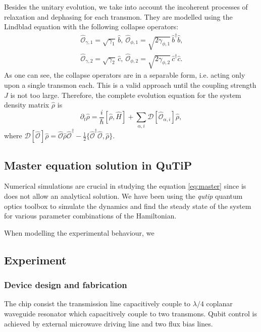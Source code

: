 \documentclass[%
 aip,
 amsmath,amssymb,
 reprint,%
]{revtex4-1}
\begin{document}
Besides the unitary evolution, we take into account the incoherent processes of relaxation and dephasing for each transmon. They are modelled using the Lindblad equation with the following collapse operators:
\begin{equation}\
\begin{split}
\hat{\mathcal{O}}_{\gamma, 1} = \sqrt{\gamma_1}\, \hat b,\ 
\hat{\mathcal{O}}_{\phi, 1} = \sqrt{2\gamma_{\phi,1}}\, \hat b^\dag \hat b,\\
\hat{\mathcal{O}}_{\gamma,2} = \sqrt{\gamma_2}\, \hat c,\ 
\hat{\mathcal{O}}_{\phi,2} = \sqrt{2\gamma_{ \phi,2}}\, \hat c^\dag \hat c.
\end{split}
\end{equation}
As one can see, the collapse operators are in a separable form, i.e. acting only upon a single transmon each. This is a valid approach until the coupling strength $J$ is not too large\cite{beaudoin2011dissipation}. Therefore, the complete evolution equation for the system density matrix $\hat \rho$ is
\begin{equation}
\partial_t \hat \rho = \frac{i}{\hbar} [\hat \rho, \hat H] + \sum_{\alpha, i} \mathcal{D}[\hat{\mathcal{O}}_{\alpha, i}] \hat \rho, \label{eq:master}
\end{equation}
where $\mathcal{D}[\hat{\mathcal{O}}]\hat \rho = \hat{\mathcal{O}} \hat \rho \hat{\mathcal{O}}^\dag - \frac{1}{2}\{ \hat{\mathcal{O}}^\dag \hat{\mathcal{O}}, \hat \rho\}$.




\subsection{Master equation solution in QuTiP}

Numerical simulations are crucial in studying the equation \eqref{eq:master} since is does not allow an analytical solution. We have been using the \textit{qutip}\cite{johansson2013qutip} quantum optics toolbox to simulate the dynamics and find the steady state of the system for various parameter combinations of the Hamiltonian.

When modelling the experimental behaviour, we 

\subsection{Experiment}
\subsubsection{Device design and fabrication}
The chip consist the transmission line capacitively couple to $\lambda/4$ coplanar waveguide resonator which capacitively couple to two transmons. Qubit control is achieved by external microwave driving line and two flux bias lines. 
\end{document}
